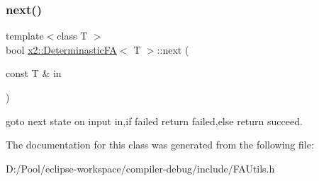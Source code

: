 \subsubsection{\texorpdfstring{next()}{next()}}
{\footnotesize\ttfamily template$<$class T $>$ \\
bool \hyperlink{classx2_1_1_determinastic_f_a}{x2\+::\+Determinastic\+FA}$<$ T $>$\+::next (\begin{DoxyParamCaption}\item[{const T \&}]{in }\end{DoxyParamCaption})\hspace{0.3cm}{\ttfamily [inline]}}

goto next state on input in,if failed return failed,else return succeed. 

The documentation for this class was generated from the following file\+:\begin{DoxyCompactItemize}
\item 
D\+:/\+Pool/eclipse-\/workspace/compiler-\/debug/include/F\+A\+Utils.\+h\end{DoxyCompactItemize}

